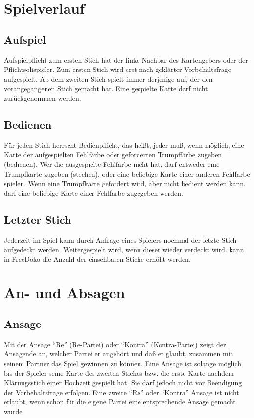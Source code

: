 \documentclass{scrartcl}
\begin{document}
\section{Spielverlauf}

\subsection{Aufspiel}
Aufspielpflicht zum ersten Stich hat der linke Nachbar des Kartengebers oder der Pflichtsolispieler. Zum ersten Stich wird erst nach geklärter Vorbehaltsfrage aufgespielt. Ab dem zweiten Stich spielt immer derjenige auf, der den vorangegangenen Stich gemacht hat. Eine gespielte Karte darf nicht zurückgenommen
werden.

\subsection{Bedienen}
Für jeden Stich herrscht Bedienpflicht, das heißt, jeder muß, wenn möglich, eine Karte der aufgespielten Fehlfarbe oder geforderten Trumpffarbe zugeben (bedienen). Wer die ausgespielte Fehlfarbe nicht hat, darf entweder eine Trumpfkarte zugeben (stechen), oder eine beliebige Karte einer anderen Fehlfarbe spielen. Wenn eine Trumpfkarte gefordert wird, aber nicht bedient werden kann, darf eine beliebige Karte einer Fehlfarbe zugegeben werden.

\subsection{Letzter Stich}
Jederzeit im Spiel kann durch Anfrage eines Spielers nochmal der letzte Stich aufgedeckt werden. Weitergespielt wird, wenn dieser wieder verdeckt wird.  \Optional kann in FreeDoko die Anzahl der einsehbaren Stiche erhöht werden.

\section{An- und Absagen}

\subsection{Ansage}
Mit der Ansage "`Re"' (Re-Partei) oder "`Kontra"' (Kontra-Partei) zeigt der Ansagende an, welcher Partei er angehört und daß er glaubt, zusammen mit seinem Partner das Spiel gewinnen zu können.  Eine Ansage ist solange möglich bis der Spieler seine Karte des zweiten Stiches bzw. die erste Karte nachdem Klärungsstich einer Hochzeit gespielt hat. Sie darf jedoch nicht vor Beendigung der Vorbehaltsfrage erfolgen. Eine zweite "`Re"' oder "`Kontra"' Ansage ist nicht erlaubt, wenn schon für die eigene Partei eine entsprechende Ansage gemacht wurde.
\end{document}
